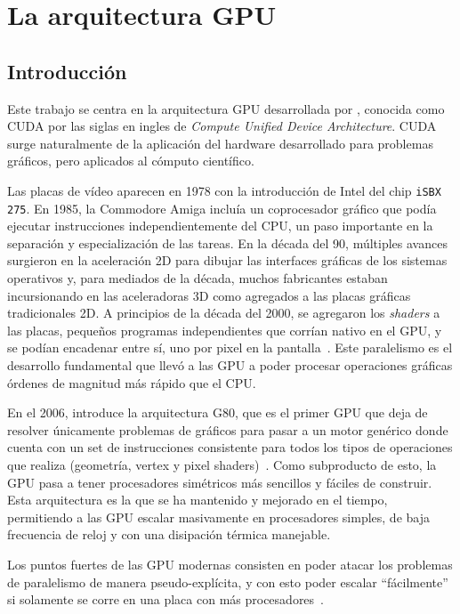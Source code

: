 \chapter{La arquitectura GPU}

\section{Introducci\'on}

Este trabajo se centra en la arquitectura GPU desarrollada por \nvidia{}, conocida como CUDA por las siglas en ingles de \textit{Compute Unified Device Architecture}.
CUDA surge naturalmente de la aplicaci\'on del hardware desarrollado para problemas gr\'aficos, pero aplicados al c\'omputo cient\'ifico.

Las placas de v\'ideo aparecen en 1978 con la introducci\'on de Intel del chip \texttt{iSBX 275}.
En 1985, la Commodore Amiga inclu\'ia un coprocesador gr\'afico que pod\'ia ejecutar instrucciones independientemente del CPU, un paso importante en la separaci\'on y especializaci\'on de las tareas.
En la d\'ecada del 90, m\'ultiples avances surgieron en la aceleraci\'on 2D para dibujar las interfaces gr\'aficas de los sistemas operativos y, para mediados de la d\'ecada, muchos fabricantes estaban incursionando en las aceleradoras 3D como agregados a las placas gr\'aficas tradicionales 2D.
A principios de la d\'ecada del 2000, se agregaron los \textit{shaders} a las placas, peque\~nos programas independientes que corr\'ian nativo en el GPU, y se pod\'ian encadenar entre s\'i, uno por pixel en la pantalla~\cite{Mark2003}.
Este paralelismo es el desarrollo fundamental que llev\'o a las GPU a poder procesar operaciones gr\'aficas \'ordenes de magnitud m\'as r\'apido que el CPU.

En el 2006, \nvidia{} introduce la arquitectura G80, que es el primer GPU que deja de resolver \'unicamente problemas de gr\'aficos para pasar a un motor gen\'erico donde cuenta con un set de instrucciones consistente para todos los tipos de operaciones que realiza (geometr\'ia, vertex y pixel shaders)~\cite{cudaHandbook}.
Como subproducto de esto, la GPU pasa a tener procesadores sim\'etricos m\'as sencillos y f\'aciles de construir.
Esta arquitectura es la que se ha mantenido y mejorado en el tiempo, permitiendo a las GPU escalar masivamente en procesadores simples, de baja frecuencia de reloj y con una disipaci\'on t\'ermica manejable.

Los puntos fuertes de las GPU modernas consisten en poder atacar los problemas de paralelismo de manera pseudo-expl\'icita, y con esto poder escalar ``f\'acilmente'' si solamente se corre en una placa con m\'as procesadores~\cite{cudaProgrammingGuide}.

